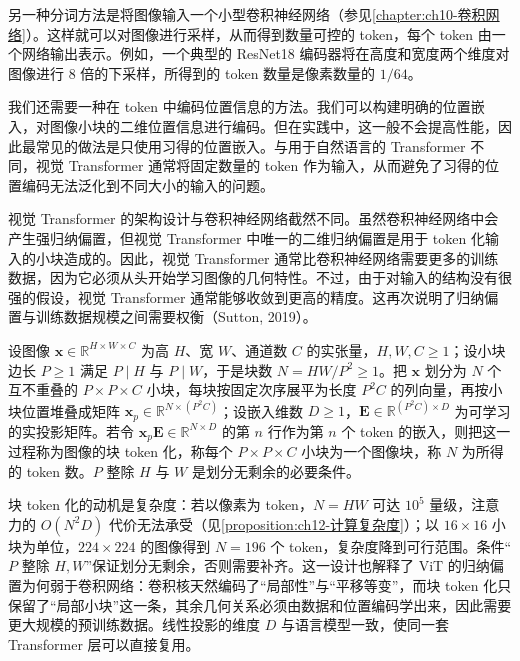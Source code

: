 \documentclass[../../main.tex]{subfiles}
\begin{document}
另一种分词方法是将图像输入一个小型卷积神经网络（参见\cref{chapter:ch10-卷积网络}）。这样就可以对图像进行采样，从而得到数量可控的 token，每个 token 由一个网络输出表示。例如，一个典型的 ResNet18 编码器将在高度和宽度两个维度对图像进行 8 倍的下采样，所得到的 token 数量是像素数量的 $1/64$。

我们还需要一种在 token 中编码位置信息的方法。我们可以构建明确的位置嵌入，对图像小块的二维位置信息进行编码。但在实践中，这一般不会提高性能，因此最常见的做法是只使用习得的位置嵌入。与用于自然语言的 Transformer 不同，视觉 Transformer 通常将固定数量的 token 作为输入，从而避免了习得的位置编码无法泛化到不同大小的输入的问题。

视觉 Transformer 的架构设计与卷积神经网络截然不同。虽然卷积神经网络中会产生强归纳偏置，但视觉 Transformer 中唯一的二维归纳偏置是用于 token 化输入的小块造成的。因此，视觉 Transformer 通常比卷积神经网络需要更多的训练数据，因为它必须从头开始学习图像的几何特性。不过，由于对输入的结构没有很强的假设，视觉 Transformer 通常能够收敛到更高的精度。这再次说明了归纳偏置与训练数据规模之间需要权衡（Sutton, 2019）。

\begin{definition}\label{definition:ch12-图像块分词}
设图像 $\mathbf{x}\in\mathbb{R}^{H\times W\times C}$ 为高 $H$、宽 $W$、通道数 $C$ 的实张量，$H,W,C\geqslant1$；设小块边长 $P\geqslant1$ 满足 $P\mid H$ 与 $P\mid W$，于是块数 $N=HW/P^{2}\geqslant1$。把 $\mathbf{x}$ 划分为 $N$ 个互不重叠的 $P\times P\times C$ 小块，每块按固定次序展平为长度 $P^{2}C$ 的列向量，再按小块位置堆叠成矩阵 $\mathbf{x}_p\in\mathbb{R}^{N\times(P^{2}C)}$；设嵌入维数 $D\geqslant1$，$\mathbf{E}\in\mathbb{R}^{(P^{2}C)\times D}$ 为可学习的实投影矩阵。若令 $\mathbf{x}_p\mathbf{E}\in\mathbb{R}^{N\times D}$ 的第 $n$ 行作为第 $n$ 个 token 的嵌入，则把这一过程称为图像的块 token 化，称每个 $P\times P\times C$ 小块为一个图像块，称 $N$ 为所得的 token 数。$P$ 整除 $H$ 与 $W$ 是划分无剩余的必要条件。
\end{definition}

\begin{remark}
块 token 化的动机是复杂度：若以像素为 token，$N=HW$ 可达 $10^{5}$ 量级，注意力的 $O(N^{2}D)$ 代价无法承受（见\cref{proposition:ch12-计算复杂度}）；以 $16\times16$ 小块为单位，$224\times224$ 的图像得到 $N=196$ 个 token，复杂度降到可行范围。条件“$P$ 整除 $H,W$”保证划分无剩余，否则需要补齐。这一设计也解释了 ViT 的归纳偏置为何弱于卷积网络：卷积核天然编码了“局部性”与“平移等变”，而块 token 化只保留了“局部小块”这一条，其余几何关系必须由数据和位置编码学出来，因此需要更大规模的预训练数据。线性投影的维度 $D$ 与语言模型一致，使同一套 Transformer 层可以直接复用。
\end{remark}
\end{document}
